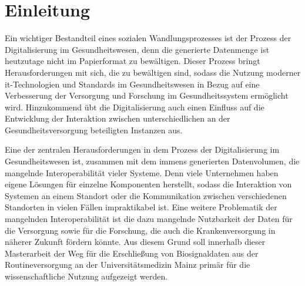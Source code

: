 \chapter{Einleitung} \label{ch:introduction}

Ein wichtiger Bestandteil eines sozialen Wandlungsprozesses ist der Prozess der Digitalisierung im Gesundheitswesen, denn die generierte Datenmenge ist heutzutage nicht im Papierformat zu bewältigen. Dieser Prozess bringt Herausforderungen mit sich, die zu bewältigen sind, sodass die Nutzung moderner \ac{it}-Technologien und Standards im Gesundheitswesen in Bezug auf eine Verbesserung der Versorgung und Forschung im Gesundheitssystem ermöglicht wird. Hinzukommend übt die Digitalisierung auch einen Einfluss auf die Entwicklung der Interaktion zwischen unterschiedlichen an der Gesundheitsversorgung beteiligten Instanzen aus. 

Eine der zentralen Herausforderungen in dem Prozess der Digitalisierung im Gesundheitswesen ist, zusammen mit dem immens generierten Datenvolumen, die mangelnde Interoperabilität vieler Systeme. Denn viele Unternehmen haben eigene Lösungen für einzelne Komponenten herstellt, sodass die Interaktion von Systemen an einem Standort oder die Kommunikation zwischen verschiedenen Standorten in vielen Fällen impraktikabel ist. Eine weitere Problematik der mangelnden Interoperabilität ist die dazu mangelnde Nutzbarkeit der Daten für die Versorgung sowie für die Forschung, die auch die Krankenversorgung in näherer Zukunft fördern könnte. Aus diesem Grund soll innerhalb dieser Masterarbeit der Weg für die Erschließung von Biosignaldaten aus der Routineversorgung an der Universitätsmedizin Mainz primär für die wissenschaftliche Nutzung aufgezeigt werden.
